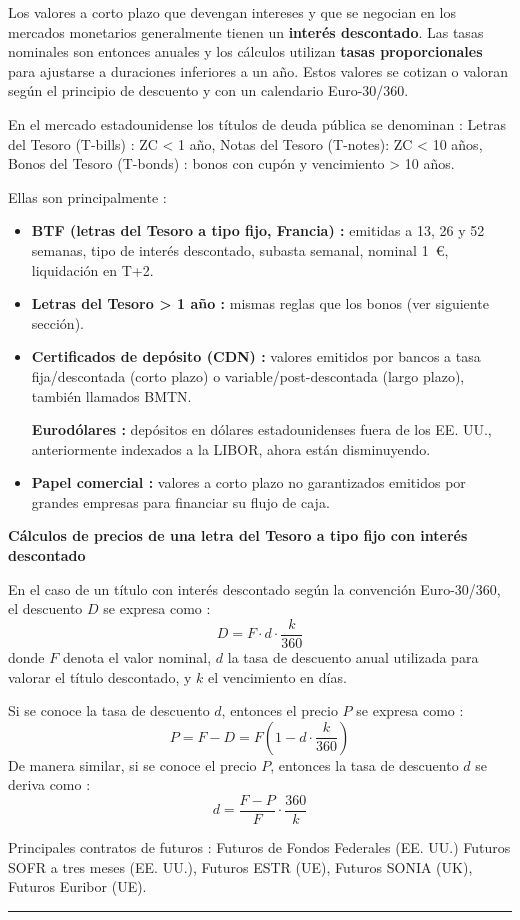 \begin{f}
Los valores a corto plazo que devengan intereses y que se negocian en los mercados monetarios generalmente tienen un \textbf{interés descontado}.
Las tasas nominales son entonces anuales y los cálculos utilizan \textbf{tasas proporcionales} para ajustarse a duraciones inferiores a un año.
Estos valores se cotizan o valoran según el principio de descuento y con un calendario Euro-30/360.

En el mercado estadounidense los títulos de deuda pública se denominan :
Letras del Tesoro (T-bills) : ZC < 1 año, Notas del Tesoro (T-notes): ZC < 10 años,
Bonos del Tesoro (T-bonds) : bonos con cupón y vencimiento > 10 años.


Ellas son principalmente :
\begin{itemize}
	\item \textbf{BTF (letras del Tesoro a tipo fijo, Francia) :} emitidas a 13, 26 y 52 semanas, tipo de interés descontado, subasta semanal, nominal 1~€, liquidación en T+2.
	
	\item \textbf{Letras del Tesoro > 1 año :} mismas reglas que los bonos (ver siguiente sección).
	
	\item \textbf{Certificados de depósito (CDN) :} valores emitidos por bancos a tasa fija/descontada (corto plazo) o variable/post-descontada (largo plazo), también llamados BMTN.
	
	\textbf{Eurodólares :} depósitos en dólares estadounidenses fuera de los EE. UU., anteriormente indexados a la LIBOR, ahora están disminuyendo.
	
	\item \textbf{Papel comercial :} valores a corto plazo no garantizados emitidos por grandes empresas para financiar su flujo de caja.
\end{itemize}

\textbf{Cálculos de precios de una letra del Tesoro a tipo fijo con interés descontado}

En el caso de un título con interés descontado según la convención Euro-30/360, el descuento \(D\) se expresa como :
\[
D=F \cdot d \cdot \frac{k}{360}
\]
donde \(F\) denota el valor nominal, \(d\) la tasa de descuento anual utilizada para valorar el título descontado, y \(k\) el vencimiento en días.

Si se conoce la tasa de descuento \(d\), entonces el precio \(P\) se expresa como :
\[
P=F-D=F\left(1-d \cdot \frac{k}{360}\right)
\]
De manera similar, si se conoce el precio \(P\), entonces la tasa de descuento \(d\) se deriva como :
\[
d=\frac{F-P}{F} \cdot \frac{360}{k}
\]


Principales contratos de futuros : Futuros de Fondos Federales (EE. UU.)
Futuros SOFR a tres meses (EE. UU.),
Futuros ESTR (UE),
Futuros SONIA (UK),
Futuros Euribor (UE).

\end{f}
\hrule



